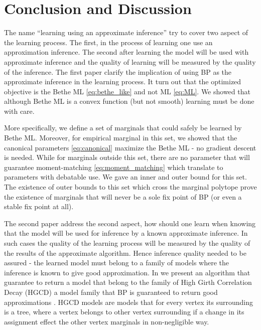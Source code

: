 \chapter{Conclusion and Discussion } %
\label{con} %
The name ``learning using an approximate inference''  try to cover two aspect of the learning process.
The first, in the process of learning one use an approximation inference.
The second after learning the model will be used with approximate inference and the quality of learning will be measured by the quality of the inference.
The first paper  clarify the implication of using BP as the approximate inference in the learning process.
It turn out that the optimized objective is the Bethe ML \eqref{eq:bethe_like} and not ML \eqref{eq:ML}.
We showed that although Bethe ML is a convex function (but not smooth) learning must be done with care.

More specifically, we define a set of marginals that could safely be learned by Bethe ML.
Moreover, for empirical marginal in this set, we showed that the canonical parameters \eqref{eq:canonical}  maximize the Bethe ML - no gradient descent is needed.
While for marginals outside this set, there are no parameter that will guarantee moment-matching \eqref{eq:moment_matching}  which translate to parameters with debatable use.
We gave an inner and outer bound for this set.
The existence of outer bounds to this set which cross the marginal polytope prove the existence of marginals that will never be a sole fix point of BP (or even a stable fix point at all).

The second paper address the second aspect, how should one learn when knowing that the model will be used for inference by a known approximate inference.
In such cases the quality of the learning process will be measured by the quality of the results of the approximate algorithm. 
Hence inference quality needed to be assured - the learned  model must belong to a family of models where the inference is known to give good approximation.
In  we present an algorithm that guarantee to return a model that belong to the family of High Girth Correlation Decay (HGCD)  a model family that BP is guaranteed to return good approximations .
HGCD models are models that for every vertex its surrounding is a tree, where a vertex belongs to other vertex surrounding if a change in its assignment effect the other vertex marginals in non-negligible way.

